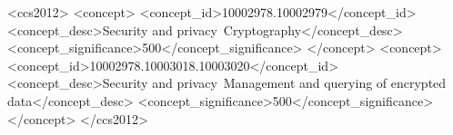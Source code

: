 




\begin{CCSXML}
<ccs2012>
   <concept>
       <concept_id>10002978.10002979</concept_id>
       <concept_desc>Security and privacy~Cryptography</concept_desc>
       <concept_significance>500</concept_significance>
       </concept>
   <concept>
       <concept_id>10002978.10003018.10003020</concept_id>
       <concept_desc>Security and privacy~Management and querying of encrypted data</concept_desc>
       <concept_significance>500</concept_significance>
       </concept>
 </ccs2012>
\end{CCSXML}

